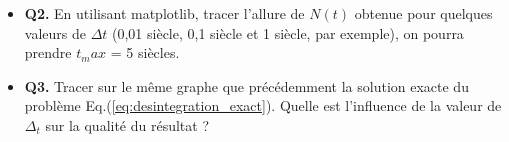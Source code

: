 \documentclass[%
oneside,                 %
final,                   %
10pt]{article}
\begin{document}
\begin{itemize}
\item \textbf{Q2.} En utilisant matplotlib, tracer l’allure de $N(t)$ obtenue pour quelques valeurs de $\Delta t$ (0,01 siècle, 0,1 siècle et 1 siècle, par exemple), on pourra prendre $t_max$ = 5 siècles.

\item \textbf{Q3.} Tracer sur le même graphe que précédemment la solution exacte du problème Eq.(\ref{eq:desintegration_exact}). Quelle est l’influence de la valeur de $\Delta_t$ sur la qualité du résultat ?
% 
% 
% 
% 
% 

\end{itemize}
\end{document}
